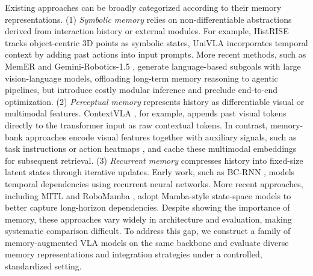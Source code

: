 Existing approaches can be broadly categorized according to their memory representations.
(1) \textit{Symbolic memory} relies on non-differentiable abstractions derived from interaction history or external modules. For example, HistRISE \cite{chen2025history} tracks object-centric 3D points as symbolic states, 
UniVLA \cite{bu2025learning} incorporates temporal context by
adding past actions into input prompts. 
More recent methods, such as MemER \cite{sridhar2025memer} and Gemini-Robotics-1.5 \cite{team2025geminirobot}, generate language-based subgoals with large vision-language models, offloading long-term memory reasoning to agentic pipelines, but introduce costly modular inference and preclude end-to-end optimization.
(2) \textit{Perceptual memory} represents history as differentiable visual or multimodal features. ContextVLA \cite{jang2025contextvla}, for example, appends past visual tokens directly to the transformer input as raw contextual tokens. In contrast, memory-bank approaches encode visual features together with auxiliary signals, such as task instructions \cite{shi2025memoryvla, koo2025hamlet} or action heatmaps \cite{fang2025sam2act}, and cache these multimodal embeddings for subsequent retrieval.
(3) \textit{Recurrent memory} compresses history into fixed-size latent states through iterative updates. Early work, such as BC-RNN \cite{mandlekar2021matters}, models temporal dependencies using recurrent neural networks. More recent approaches, including MITL \cite{zhou2025mtil} and RoboMamba \cite{liu2024robomamba}, adopt Mamba-style state-space models \cite{gu2024mamba} to better capture long-horizon dependencies.
Despite showing the importance of memory, these approaches vary widely in architecture and evaluation, making systematic comparison difficult. To address this gap, we construct a family of memory-augmented VLA models on the same backbone and evaluate diverse memory representations and integration strategies under a controlled, standardized setting.